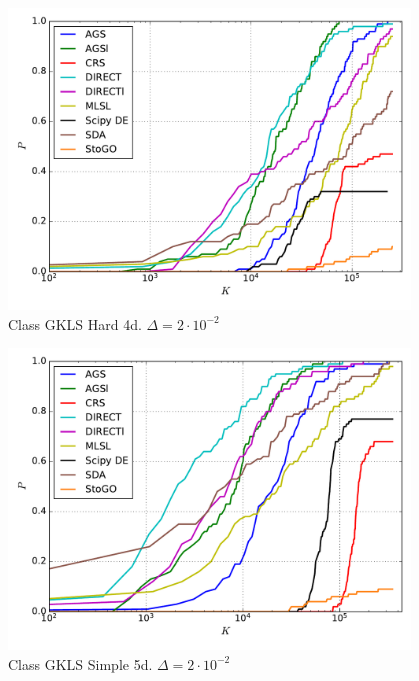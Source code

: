 \documentclass[a4paper]{article}
\begin{document}
\begin{figure}[H]
  \center
  \includegraphics[width=0.95\textwidth]{../experiments/gklsh4d/cmc.pdf}
  \caption{Class GKLS Hard 4d. $\Delta=2\cdot10^{-2}$}
\end{figure}


\begin{figure}[H]
  \center
  \includegraphics[width=0.95\textwidth]{../experiments/gklss5d/cmc.pdf}
  \caption{Class GKLS Simple 5d. $\Delta=2\cdot10^{-2}$}
\end{figure}

\end{document}
